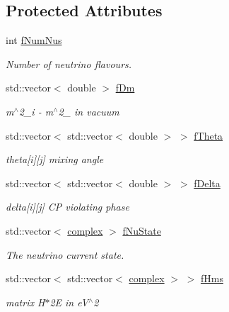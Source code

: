 \subsection*{Protected Attributes}
\begin{DoxyCompactItemize}
\item 
int \hyperlink{classOscProb_1_1PMNS__Base_a24bb74bed63569dfe88b18fa6a08060e}{f\+Num\+Nus}
\begin{DoxyCompactList}\small\item\em Number of neutrino flavours. \end{DoxyCompactList}\item 
std\+::vector$<$ double $>$ \hyperlink{classOscProb_1_1PMNS__Base_a406a31c3b5d620e5a0cace5b411f9f70}{f\+Dm}
\begin{DoxyCompactList}\small\item\em m$^\wedge$2\+\_\+i -\/ m$^\wedge$2\+\_ in vacuum \end{DoxyCompactList}\item 
std\+::vector$<$ std\+::vector$<$ double $>$ $>$ \hyperlink{classOscProb_1_1PMNS__Base_a1976887cd658dd86b2336c181f1470b4}{f\+Theta}
\begin{DoxyCompactList}\small\item\em theta\mbox{[}i\mbox{]}\mbox{[}j\mbox{]} mixing angle \end{DoxyCompactList}\item 
std\+::vector$<$ std\+::vector$<$ double $>$ $>$ \hyperlink{classOscProb_1_1PMNS__Base_ab2a5fa40e689b221c8a7d2c17213810d}{f\+Delta}
\begin{DoxyCompactList}\small\item\em delta\mbox{[}i\mbox{]}\mbox{[}j\mbox{]} CP violating phase \end{DoxyCompactList}\item 
std\+::vector$<$ \hyperlink{classOscProb_1_1PMNS__Base_ae86ec4718808ce9d02e5f5b4226714ab}{complex} $>$ \hyperlink{classOscProb_1_1PMNS__Base_ad38a7107c3ab393591fd5ba21658300b}{f\+Nu\+State}
\begin{DoxyCompactList}\small\item\em The neutrino current state. \end{DoxyCompactList}\item 
std\+::vector$<$ std\+::vector$<$ \hyperlink{classOscProb_1_1PMNS__Base_ae86ec4718808ce9d02e5f5b4226714ab}{complex} $>$ $>$ \hyperlink{classOscProb_1_1PMNS__Base_adf5901166216e8c7a5cff2092952f473}{f\+Hms}
\begin{DoxyCompactList}\small\item\em matrix H$\ast$2E in e\+V$^\wedge$2 \end{DoxyCompactList}\item 

\end{DoxyCompactItemize}
